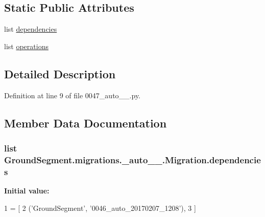 \subsection*{Static Public Attributes}
\begin{DoxyCompactItemize}
\item 
list \hyperlink{class_ground_segment_1_1migrations_1_10047__auto__20170207__1238_1_1_migration_a030e4103f3849c20039eeaa2768bf10b}{dependencies}
\item 
list \hyperlink{class_ground_segment_1_1migrations_1_10047__auto__20170207__1238_1_1_migration_a0c2deb0027d2825797edb39bc5d286ef}{operations}
\end{DoxyCompactItemize}


\subsection{Detailed Description}


Definition at line 9 of file 0047\+\_\+auto\+\_\+\_.\+py.



\subsection{Member Data Documentation}
\hypertarget{class_ground_segment_1_1migrations_1_10047__auto__20170207__1238_1_1_migration_a030e4103f3849c20039eeaa2768bf10b}{}
\subsubsection[{dependencies}]{\setlength{\rightskip}{0pt plus 5cm}list Ground\+Segment.\+migrations.\+\_\+auto\+\_\+\_.\+Migration.\+dependencies\hspace{0.3cm}{\ttfamily [static]}}\label{class_ground_segment_1_1migrations_1_10047__auto__20170207__1238_1_1_migration_a030e4103f3849c20039eeaa2768bf10b}
{\bfseries Initial value\+:}
\begin{DoxyCode}
1 = [
2         (\textcolor{stringliteral}{'GroundSegment'}, \textcolor{stringliteral}{'0046\_auto\_20170207\_1208'}),
3     ]
\end{DoxyCode}


